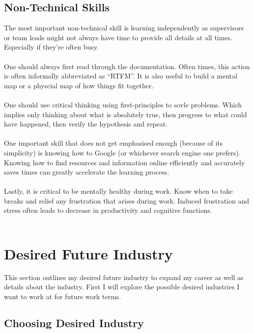 \documentclass[10pt,letterpaper]{article}
\begin{document}
\subsection{Non-Technical Skills}

The most important non-technical skill is learning independently as supervisors or team leads might not always have time to provide all details at all times. Especially if they're often busy.\\
\\
One should always first read through the documentation. Often times, this action is often informally abbreviated as ``RTFM''. It is also useful to build a mental map or a physcial map of how things fit together.\\
\\
One should use critical thinking using first-principles to sovle problems. Which implies only thinking about what is absolutely true, then progress to what could have happened, then verify the hypothesis and repeat.\\
\\
One important skill that does not get emphasised enough (because of its simplicity) is knowing how to Google (or whichever search engine one prefers). Knowing how to find resources and information online efficiently and accurately saves times can greatly accelerate the learning process.\\
\\
Lastly, it is critical to be mentally healthy during work. Know when to take breaks and relief any frustration that arises during work. Induced frustration and stress often leads to decrease in productivity and cognitive functions.\\
\\
\clearpage
\section{Desired Future Industry}\label{desired-future-industry}

This section outlines my desired future industry to expand my career as well as details about the industry. First I will explore the possible desired industries I want to work at for future work terms.

\subsection{Choosing Desired Industry}
\end{document}
